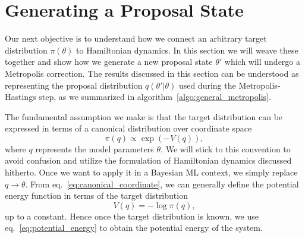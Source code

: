 \section{Generating a Proposal State}
Our next objective is to understand how we connect an arbitrary target distribution $\pi(\theta)$
to Hamiltonian dynamics. In this section we will weave these together and show how we
generate a new proposal state $\theta'$ which will undergo a Metropolis correction.
The results discussed in this section can be understood as representing the proposal distribution $q(\theta'|\theta)$ used during the Metropolis-Hastings step,
as we summarized in algorithm~\ref{algo:general_metropolis}. 

The fundamental assumption we make is that the target distribution can be expressed in terms of a
canonical distribution over coordinate space
\begin{equation}\label{eq:canonical_coordinate}
  \pi(q) \propto \exp\left(-V(q)\right),
\end{equation}
where $q$ represents the model parameters $\theta$. We will stick to this convention to avoid confusion and 
utilize the formulation of Hamiltonian dynamics discussed hitherto. Once we want to apply it in a Bayesian ML context,
we simply replace $q \to \theta$. From eq.~\eqref{eq:canonical_coordinate}, we can generally define the potential
energy function in terms of the target distribution
\begin{equation}\label{eq:potential_energy}
  V(q) = - \log \pi(q),
\end{equation}
up to a constant. Hence once the target distribution is known,
we use eq.~\eqref{eq:potential_energy} to obtain the potential energy of the system.

